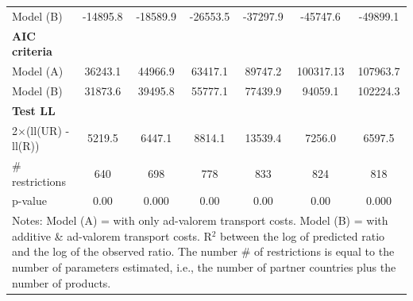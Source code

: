 \documentclass[a4paper,11pt]{article}
\begin{document}
\begin{table}[htbp]
\begin{center}
{\begin{tabular}{l|cccccc}
Model (B) & \multicolumn{1}{c}{-14895.8} & \multicolumn{1}{c}{-18589.9} & \multicolumn{1}{c}{-26553.5} & \multicolumn{1}{c}{-37297.9} & \multicolumn{1}{c}{-45747.6} & \multicolumn{1}{c}{-49899.1}  \\
\textbf{AIC criteria} & \multicolumn{1}{c}{} & \multicolumn{1}{c}{} & \multicolumn{1}{c}{} &       & \multicolumn{1}{c}{}  \\
Model (A)& \multicolumn{1}{c}{36243.1} & \multicolumn{1}{c}{44966.9} & \multicolumn{1}{c}{63417.1} & \multicolumn{1}{c}{89747.2} & \multicolumn{1}{c}{100317.13} & \multicolumn{1}{c}{107963.7} \\
Model (B) & \multicolumn{1}{c}{31873.6} & \multicolumn{1}{c}{39495.8} & \multicolumn{1}{c}{55777.1} & \multicolumn{1}{c}{77439.9} & \multicolumn{1}{c}{94059.1} & \multicolumn{1}{c}{102224.3}  \\
\textbf{Test LL} &       &       &       &       &       &       \\
2$\times$(ll(UR) -ll(R)) & \multicolumn{1}{c}{5219.5} & \multicolumn{1}{c}{6447.1} & \multicolumn{1}{c}{8814.1} & \multicolumn{1}{c}{13539.4} & \multicolumn{1}{c}{7256.0} & \multicolumn{1}{c}{6597.5}  \\
\# restrictions  & \multicolumn{1}{c}{640} & \multicolumn{1}{c}{698} & \multicolumn{1}{c}{778} & \multicolumn{1}{c}{833} & \multicolumn{1}{c}{824} & \multicolumn{1}{c}{818}  \\
p-value & \multicolumn{1}{c}{0.00} & \multicolumn{1}{c}{0.000} & \multicolumn{1}{c}{0.00} & \multicolumn{1}{c}{0.00} & \multicolumn{1}{c}{0.00} & \multicolumn{1}{c}{0.000} \\
\hline\hline
\multicolumn{7}{l}{\parbox[l]{13cm}{ \vspace{7pt}\scriptsize{Notes: Model (A) = with only ad-valorem transport costs. Model (B) = with additive \& ad-valorem
transport costs. R$^{2}$ between the log of predicted ratio and the log of the observed ratio. The number \# of restrictions is equal to the number of parameters estimated, i.e., the number of partner countries plus the number of products.}}}
\end{tabular}%
}
\end{center}
\end{table}%
\end{document}
